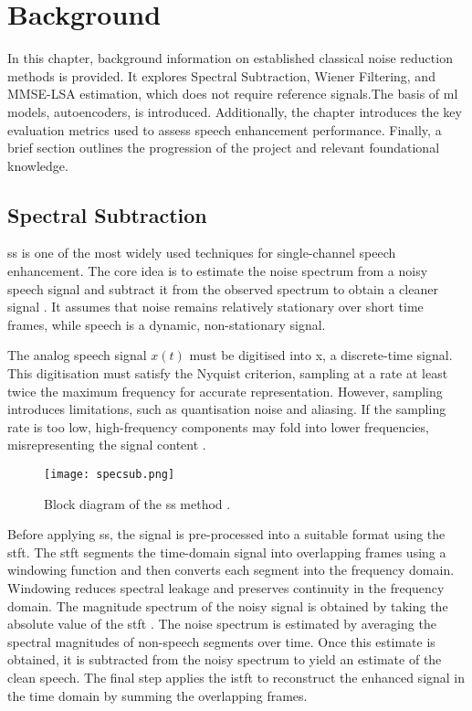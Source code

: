 \graphicspath{{content/chapters/2_background/figures/}}
\chapter{Background}
\label{chp:background}

In this chapter, background information on established classical noise reduction methods is provided. It explores Spectral Subtraction, Wiener Filtering, and MMSE-LSA estimation, which does not require reference signals.The basis of \gls{ml} models, autoencoders, is introduced. Additionally, the chapter introduces the key evaluation metrics used to assess speech enhancement performance. Finally, a brief section outlines the progression of the project and relevant foundational knowledge.

\section{Spectral Subtraction}
\label{sec:spectral_subtraction}

\gls{ss} is one of the most widely used techniques for single-channel speech enhancement. The core idea is to estimate the noise spectrum from a noisy speech signal and subtract it from the observed spectrum to obtain a cleaner signal \cite{loizou2013speech}. It assumes that noise remains relatively stationary over short time frames, while speech is a dynamic, non-stationary signal.

The analog speech signal \(x(t)\) must be digitised into \gls{x}, a discrete-time signal. This digitisation must satisfy the Nyquist criterion, sampling at a rate at least twice the maximum frequency for accurate representation. However, sampling introduces limitations, such as quantisation noise and aliasing. If the sampling rate is too low, high-frequency components may fold into lower frequencies, misrepresenting the signal content \cite{loizou2013speech}.

\begin{figure}[h]
    \centering
    \texttt{[image: specsub.png]}
    \caption{\label{fig:SSBlock} Block diagram of the \gls{ss} method \cite{dubey2016evaluation}.}
\end{figure}

Before applying \gls{ss}, the signal is pre-processed into a suitable format using the \gls{stft}. The \gls{stft} segments the time-domain signal into overlapping frames using a windowing function and then converts each segment into the frequency domain. Windowing reduces spectral leakage and preserves continuity in the frequency domain. The magnitude spectrum of the noisy signal is obtained by taking the absolute value of the \gls{stft} \cite{dubey2016evaluation}. The noise spectrum is estimated by averaging the spectral magnitudes of non-speech segments over time. Once this estimate is obtained, it is subtracted from the noisy spectrum to yield an estimate of the clean speech. The final step applies the \gls{istft} to reconstruct the enhanced signal in the time domain by summing the overlapping frames.

